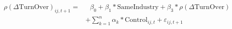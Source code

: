 \begin{equation*}
\begin{split}
\rho(\Delta \text{TurnOver})_{ij,t+1} = & \text{ 	}\beta_0 + \beta_1* \text{SameIndustry} +\beta_3* \rho(\Delta \text{TurnOver}) \\
&+ \sum_{k=1} ^{n} \alpha_k*\text{Control}_{ij,t} + \varepsilon_{ij,t+1}
\end{split}
\end{equation*}